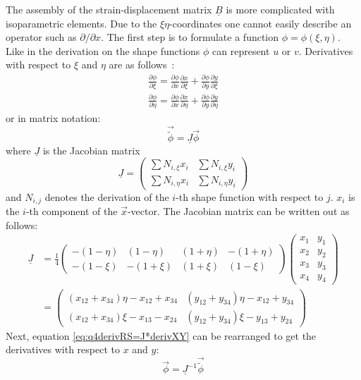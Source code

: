   The assembly of the strain-displacement matrix $\underline{B}$ is more complicated with isoparametric elements. Due to the $\xi\eta$-coordinates one cannot easily describe an operator such as $\partial/\partial x$. The first step is to formulate a function $\phi = \phi(\xi,\eta)$. Like in the derivation on the shape functions $\phi$ can represent $u$ or $v$. Derivatives with respect to $\xi$ and $\eta$ are as follows~\cite{cook2002concepts}:
  \begin{align}
  \frac{\partial \phi}{\partial \xi} = \frac{\partial \phi}{\partial x} \frac{\partial x}{\partial \xi} + \frac{\partial \phi}{\partial y} \frac{\partial y}{\partial \xi} \nonumber\\
  \frac{\partial \phi}{\partial \eta} = \frac{\partial \phi}{\partial x} \frac{\partial x}{\partial \eta} + \frac{\partial \phi}{\partial y} \frac{\partial y}{\partial \eta}
  \end{align}
  or in matrix notation:
  \begin{equation}\label{eq:q4derivRS=J*derivXY}
  \vec{\tilde{\phi}} = \underline{J} \vec{\phi}
  \end{equation}
  where $\underline{J}$ is the Jacobian matrix
  \begin{equation}
  \underline{J} = \begin{pmatrix}
  \sum N_{i,\xi}x_i & \sum N_{i,\xi}y_i\\
  \sum N_{i,\eta}x_i & \sum N_{i,\eta}y_i
  \end{pmatrix}
  \end{equation}
  and $N_{i,j}$ denotes the derivation of the $i$-th shape function with respect to $j$. $x_i$ is the $i$-th component of the $\vec{x}$-vector. The Jacobian matrix can be written out as follows:
  \begin{align}
  \underline{J} &= \frac{1}{4}\begin{pmatrix}
  -(1-\eta) & (1-\eta) & (1+\eta) & -(1+\eta)\\
  -(1-\xi) & -(1+\xi) & (1+\xi) & (1-\xi)
  \end{pmatrix} \begin{pmatrix}
  x_1 & y_1\\
  x_2 & y_2\\
  x_3 & y_3\\
  x_4 & y_4
  \end{pmatrix} \nonumber\\
  &= \begin{pmatrix}
  (x_{12}+x_{34})\eta - x_{12} + x_{34} & (y_{12} + y_{34})\eta - x_{12} + y_{34}\\
  (x_{12}+x_{34})\xi  - x_{13} - x_{24} & (y_{12} + y_{34})\xi  - y_{13} + y_{24}
  \end{pmatrix}
  \end{align}
  Next, equation \eqref{eq:q4derivRS=J*derivXY} can be rearranged to get the derivatives with respect to $x$ and $y$:
  \begin{equation}
  \vec{\phi} = \underline{J}^{-1}\vec{\tilde{\phi}}
  \end{equation}
  
